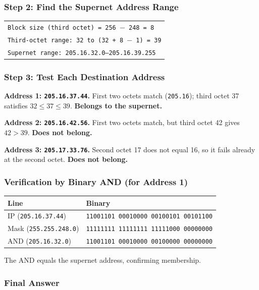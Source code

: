 \documentclass[11pt,a4paper]{article}
\begin{document}
\subsubsection*{Step 2: Find the Supernet Address Range}

\begin{tabularx}{\textwidth}{@{}X@{}}
\texttt{Block size (third octet) = 256 $-$ 248 = 8} \\
\texttt{Third-octet range: 32 to (32 + 8 $-$ 1) = 39} \\
\texttt{Supernet range: 205.16.32.0--205.16.39.255} \\
\end{tabularx}

\subsubsection*{Step 3: Test Each Destination Address}

\textbf{Address 1: \texttt{205.16.37.44}.} First two octets match
(\texttt{205.16}); third octet 37 satisfies $32 \le 37 \le 39$. \textbf{Belongs
to the supernet.}

\textbf{Address 2: \texttt{205.16.42.56}.} First two octets match, but third
octet 42 gives $42 > 39$. \textbf{Does not belong.}

\textbf{Address 3: \texttt{205.17.33.76}.} Second octet 17 does not equal 16,
so it fails already at the second octet. \textbf{Does not belong.}

\subsubsection*{Verification by Binary AND (for Address 1)}

\begin{tabularx}{\textwidth}{@{}lX@{}}
\toprule
\rowcolor{tablehead}\textbf{Line} & \textbf{Binary} \\
\midrule
IP (\texttt{205.16.37.44}) & \texttt{11001101 00010000 00100101 00101100} \\
Mask (\texttt{255.255.248.0}) & \texttt{11111111 11111111 11111000 00000000} \\
AND (\texttt{205.16.32.0}) & \texttt{11001101 00010000 00100000 00000000} \\
\bottomrule
\end{tabularx}

The AND equals the supernet address, confirming membership.

\subsubsection*{Final Answer}
\end{document}
